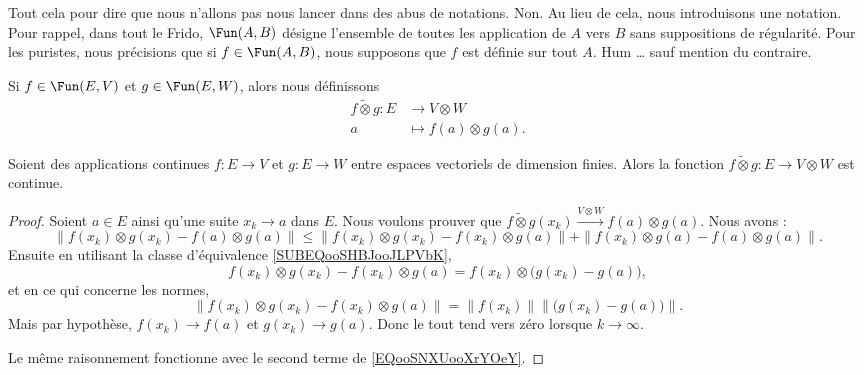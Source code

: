 Tout cela pour dire que nous n'allons pas nous lancer dans des abus de notations. Non. Au lieu de cela, nous introduisons une notation. Pour rappel, dans tout le Frido, \( \Fun(A,B)\) désigne l'ensemble de toutes les application de \( A\) vers \( B\) sans suppositions de régularité. Pour les puristes, nous précisions que si \( f\in\Fun(A,B)\), nous supposons que \( f\) est définie sur tout \( A\). Hum \ldots{} sauf mention du contraire.
\begin{definition}      \label{DEFooMVNDooFWFtRn}
	Si \( f\in \Fun(E,V)\) et \( g\in \Fun(E,W)\), alors nous définissons
	\begin{equation}
		\begin{aligned}
			f\tilde\otimes g\colon E & \to V\otimes W            \\
			a                        & \mapsto f(a)\otimes g(a).
		\end{aligned}
	\end{equation}
\end{definition}

\begin{proposition}     \label{PROPooCRVXooEGxdZl}
	Soient des applications continues \( f\colon E\to V\) et \( g\colon E\to W\) entre espaces vectoriels de dimension finies. Alors la fonction \( f\tilde\otimes g\colon E\to V\otimes W\) est continue.
\end{proposition}

\begin{proof}
	Soient \( a\in E\) ainsi qu'une suite \( x_k\to a\) dans \( E\). Nous voulons prouver que \( f\tilde\otimes g(x_k)\stackrel{V\otimes W}{\longrightarrow}f(a)\otimes g(a)\). Nous avons :
	\begin{equation}        \label{EQooSNXUooXrYOeY}
		\| f(x_k)\otimes g(x_k)-f(a)\otimes g(a) \|\leq \| f(x_k)\otimes g(x_k)-f(x_k)\otimes g(a) \|+\| f(x_k)\otimes g(a)-f(a)\otimes g(a) \|.
	\end{equation}
	Ensuite en utilisant la classe d'équivalence \eqref{SUBEQooSHBJooJLPVbK},
	\begin{equation}
		f(x_k)\otimes g(x_k)-f(x_k)\otimes g(a)=f(x_k)\otimes \big( g(x_k)-g(a) \big),
	\end{equation}
	et en ce qui concerne les normes,
	\begin{equation}
		\|   f(x_k)\otimes g(x_k)-f(x_k)\otimes g(a)\|  =\|f(x_k)\|  \| \big( g(x_k)-g(a) \big)\|.
	\end{equation}
	Mais par hypothèse, \( f(x_k)\to f(a)\) et \( g(x_k)\to g(a)\). Donc le tout tend vers zéro lorsque \( k\to \infty\).

	Le même raisonnement fonctionne avec le second terme de \eqref{EQooSNXUooXrYOeY}.
\end{proof}

